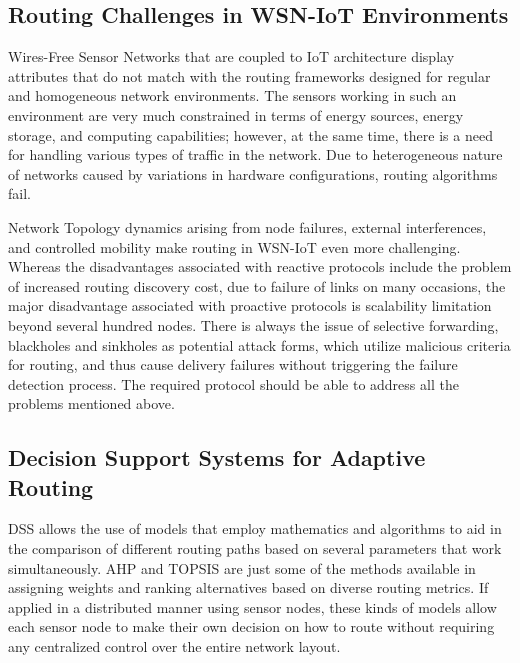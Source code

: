 \documentclass[a4paper,fleqn]{cas-dc}
\numberwithin{equation}{section}
\begin{document}
\subsection{Routing Challenges in WSN-IoT Environments}
\label{subsec:challenges}

Wires-Free Sensor Networks that are coupled to IoT
architecture display attributes that do not match with the routing
frameworks designed for regular and homogeneous network environments.
\cite{R2_Alzaylaee2025SmartHomeVulnerabilities}
The sensors working in such an environment are very much constrained
in terms of energy sources, energy storage, and computing capabilities;
however, at the same time, there is a need for handling various types
of traffic in the network. Due to heterogeneous nature of networks
caused by variations in hardware configurations, routing algorithms
fail. \cite{R23_Mudholkar2024ChallengesIoTSecurity}

Network Topology dynamics arising from node failures, external
interferences, and controlled mobility make routing in WSN-IoT even more challenging.\cite{Laroui2021EdgeFogIoT,R21_Pessoa2024RITAResilientIoT}
Whereas the disadvantages associated with reactive protocols include the problem of increased routing discovery cost, due to failure of links on many occasions, the major disadvantage associated with proactive protocols is scalability limitation beyond several hundred nodes. There is always the issue of selective forwarding, blackholes and sinkholes as potential attack forms, which utilize malicious criteria for routing, and thus cause delivery failures without triggering the failure detection process. The required protocol should be able to address all the problems mentioned above.

\subsection{Decision Support Systems for Adaptive Routing}
\label{subsec:dss}

DSS allows the use of models that employ mathematics and algorithms to aid in the comparison of different routing paths based on several parameters that work simultaneously.
AHP and TOPSIS are just some of the methods available in assigning weights and ranking alternatives based on diverse routing metrics.
If applied in a distributed manner using sensor nodes, these kinds of models allow each sensor node to make their own decision on how to route without requiring any centralized control over the entire network layout.
\end{document}
